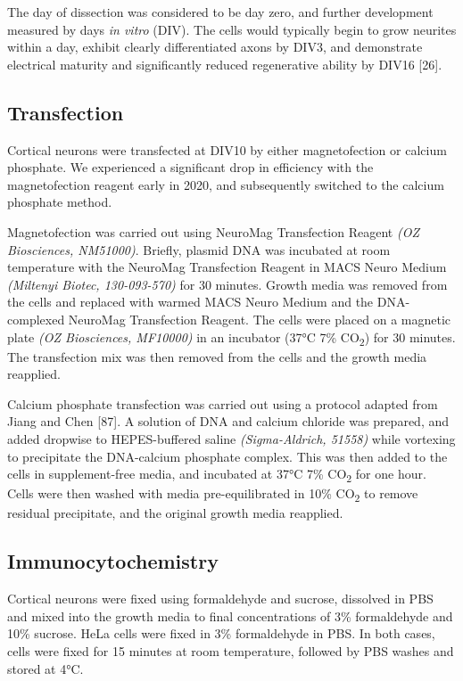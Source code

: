 \documentclass[
  12pt,
  a4paper,
]{book}
\begin{document}
The day of dissection was considered to be day zero, and further development measured by days \emph{in vitro} (DIV). The cells would typically begin to grow neurites within a day, exhibit clearly differentiated axons by DIV3, and demonstrate electrical maturity and significantly reduced regenerative ability by DIV16 {[}26{]}.

\hypertarget{transfection}{%
\subsection{Transfection}\label{transfection}}

Cortical neurons were transfected at DIV10 by either magnetofection or calcium phosphate. We experienced a significant drop in efficiency with the magnetofection reagent early in 2020, and subsequently switched to the calcium phosphate method.

Magnetofection was carried out using NeuroMag Transfection Reagent \emph{(OZ Biosciences, NM51000)}. Briefly, plasmid DNA was incubated at room temperature with the NeuroMag Transfection Reagent in MACS Neuro Medium \emph{(Miltenyi Biotec, 130-093-570)} for 30 minutes. Growth media was removed from the cells and replaced with warmed MACS Neuro Medium and the DNA-complexed NeuroMag Transfection Reagent. The cells were placed on a magnetic plate \emph{(OZ Biosciences, MF10000)} in an incubator (37°C 7\% CO\textsubscript{2}) for 30 minutes. The transfection mix was then removed from the cells and the growth media reapplied.

Calcium phosphate transfection was carried out using a protocol adapted from Jiang and Chen {[}87{]}. A solution of DNA and calcium chloride was prepared, and added dropwise to HEPES-buffered saline \emph{(Sigma-Aldrich, 51558)} while vortexing to precipitate the DNA-calcium phosphate complex. This was then added to the cells in supplement-free media, and incubated at 37°C 7\% CO\textsubscript{2} for one hour. Cells were then washed with media pre-equilibrated in 10\% CO\textsubscript{2} to remove residual precipitate, and the original growth media reapplied.

\hypertarget{immuno}{%
\subsection{Immunocytochemistry}\label{immuno}}

Cortical neurons were fixed using formaldehyde and sucrose, dissolved in PBS and mixed into the growth media to final concentrations of 3\% formaldehyde and 10\% sucrose. HeLa cells were fixed in 3\% formaldehyde in PBS. In both cases, cells were fixed for 15 minutes at room temperature, followed by PBS washes and stored at 4°C.
\end{document}
